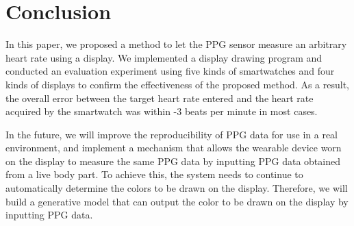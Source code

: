 \documentclass[sigchi,authordraft]{acmart}
\begin{document}
\section{Conclusion}
\label{sec:conclusion}
In this paper, we proposed a method to let the PPG sensor measure an arbitrary heart rate using a display. We implemented a display drawing program and conducted an evaluation experiment using five kinds of smartwatches and four kinds of displays to confirm the effectiveness of the proposed method. As a result, the overall error between the target heart rate entered and the heart rate acquired by the smartwatch was within -3 beats per minute in most cases.\par

In the future, we will improve the reproducibility of PPG data for use in a real environment, and implement a mechanism that allows the wearable device worn on the display to measure the same PPG data by inputting PPG data obtained from a live body part. To achieve this, the system needs to continue to automatically determine the colors to be drawn on the display. Therefore, we will build a generative model that can output the color to be drawn on the display by inputting PPG data.







\end{document}

